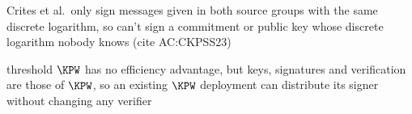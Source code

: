 \begin{outline}
  \item Crites et al.\ only sign messages given in both source groups with the
same discrete logarithm, so can't sign a commitment or public key whose discrete
logarithm nobody knows (cite AC:CKPSS23)
  \item threshold $\KPW$ has no efficiency advantage, but keys, signatures and
verification are those of $\KPW$, so an existing $\KPW$ deployment can distribute
its signer without changing any verifier
\end{outline}
